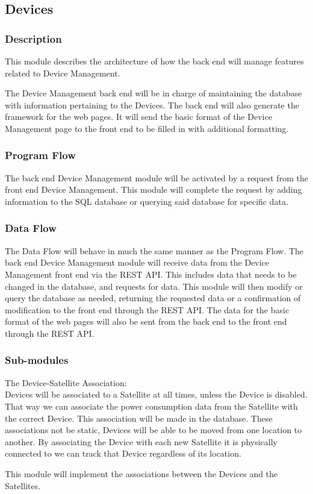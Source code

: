 
\subsection{Devices}

\subsubsection{Description}

This module describes the architecture of how the back end will manage features related to Device Management. 

The Device Management back end will be in charge of maintaining the database with information pertaining to the Devices. 
The back end will also generate the framework for the web pages. 
It will send the basic format of the Device Management page to the front end to be filled in with additional formatting. 
 

\subsubsection{Program Flow}

The back end Device Management module will be activated by a request from the front end Device Management. 
This module will complete the request by adding information to the SQL database or querying said database for specific data. 

\subsubsection{Data Flow}

The Data Flow will behave in much the same manner as the Program Flow. 
The back end Device Management module will receive data from the Device Management front end via the REST API. 
This includes data that needs to be changed in the database, and requests for data. 
This module will then modify or query the database as needed, 
returning the requested data or a confirmation of modification to the front end through the REST API. 
The data for the basic format of the web pages will also be sent from the back end to the front end through the REST API. 

\subsubsection{Sub-modules}
The Device-Satellite Association: \\
Devices will be associated to a Satellite at all times, unless the Device is disabled. 
That way we can associate the power consumption data from the Satellite with the correct Device. 
This association will be made in the database. 
These associations not be static, Devices will be able to be moved from one location to another. 
By associating the Device with each new Satellite it is physically connected to we can track that Device regardless of its location. 

This module will implement the associations between the Devices and the Satellites. 